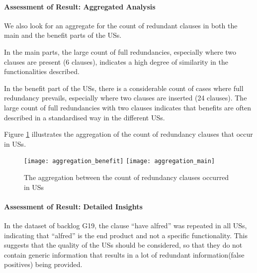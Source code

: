 \paragraph{Assessment of Result: Aggregated Analysis}We also look for an aggregate for the count of redundant clauses in both the main and the benefit parts of the USs. 

In the main parts, the large count of full redundancies, especially where two clauses are present (6 clauses), indicates a high degree of similarity in the functionalities described.

In the benefit part of the USs, there is a considerable count of cases where full redundancy prevails, especially where two clauses are inserted (24 clauses). The large count of full redundancies with two clauses indicates that benefits are often described in a standardised way in the different USs.

Figure \ref{fig:aggregation} illustrates the aggregation of the count of redundancy clauses that occur in USs.

\begin{figure}[h]
	\centering
	\texttt{[image: aggregation\_benefit]}
	\texttt{[image: aggregation\_main]}
	\caption{The aggregation between the count of redundancy clauses occurred in USs}\label{fig:aggregation}
\end{figure}
\paragraph{Assessment of Result: Detailed Insights}In the dataset of backlog G19, the clause \enquote{have alfred} was repeated in all USs, indicating that \enquote{alfred} is the end product and not a specific functionality. This suggests that the quality of the USs should be considered, so that they do not contain generic information that results in a lot of redundant information(false positives) being provided.

